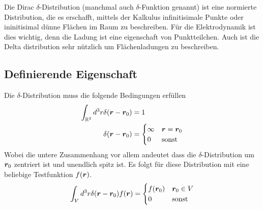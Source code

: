 Die Dirac $\delta$-Distribution (manchmal auch $\delta$-Funktion genannt) ist
eine normierte Distribution, die es erschafft, mittels der Kalkulus 
infinitisimale Punkte oder ininitisimal dünne Flächen im Raum zu beschreiben.
Für die Elektrodynamik ist dies wichtig, denn die Ladung ist eine eigenschaft
von Punktteilchen. Auch ist die Delta distribution sehr nützlich um 
Flächenladungen zu beschreiben.

\subsection{Definierende Eigenschaft}%
\label{sub:definierende-eigenschaft}
Die $\delta$-Distribution muss die folgende Bedingungen erfüllen
\begin{equation}
  \begin{split}
    \int_{\mathbb{R}^3}d^3r\delta(\vb*r-\vb*r_0) &= 1 \\
    \delta(\vb*r - \vb*r_0) &= 
    \begin{cases}
      \infty & \vb*r=\vb*r_0\\
      0 & \mathrm{sonst}
    \end{cases}
  \end{split}
\end{equation}
Wobei die untere Zusammenhang vor allem andeutet dass die 
$\delta$-Distribution um $\vb*r_0$ zentriert ist und unendlich spitz ist.
Es folgt für diese Distribution mit eine beliebige Testfunktion $f(\vb*r)$.
\begin{equation}
    \int_V d^3r \delta(\vb*r -\vb*r_0)f(\vb*r) = 
    \begin{cases}
      f(\vb*r_0) & \vb*r_0\in V\\
      0 & \mathrm{sonst}
    \end{cases}
\end{equation}

